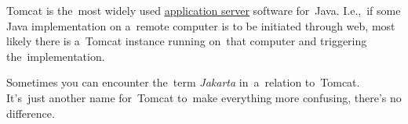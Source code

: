 \label{tomcat}
Tomcat is the~most widely used \hyperref[applicationserver]{application server} software for~Java.
I.e.,~if some Java implementation on a~remote computer is to be initiated through web, most likely there is a~Tomcat instance running on~that computer and triggering the~implementation.

\warning Sometimes you can encounter the~term \textit{Jakarta} in~a~relation to~Tomcat.
It's~just another name for~Tomcat to~make everything more confusing, there's no difference.

